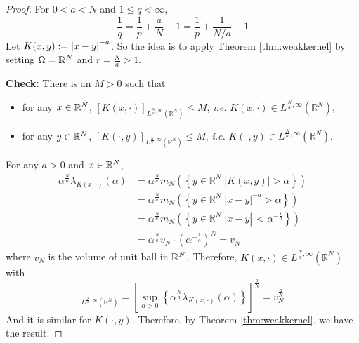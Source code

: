 \begin{proof}
	For $0 < a < N$ and $1 \leq q < \infty$,
	\begin{equation*}
		\frac{1}{q}=\frac{1}{p}+\frac{a}{N}-1=\frac{1}{p}+\frac{1}{N / a}-1
	\end{equation*}
	Let $K(x,y) \vcentcolon= \left\lvert x - y\right\lvert^{-a}$. So the idea is to apply Theorem \ref{thm:weakkernel} by setting $\Omega = \mathbb{R}^N$ and $r = \frac{N}{a} > 1$.

	\noindent \textbf{Check:} There is an $M > 0$ such that
	\begin{itemize}
		\item for any $x \in \mathbb{R}^N$, $[K(x, \cdot)]_{L^{\frac{N}{a}, \infty}\left(\mathbb{R}^N\right)} \leq M$, \emph{i.e.} $K(x, \cdot) \in L^{\frac{N}{a}, \infty}\left(\mathbb{R}^N\right)$,
		\item for any $y \in \mathbb{R}^N$, $[K(\cdot,y)]_{L^{\frac{N}{a}, \infty}\left(\mathbb{R}^N\right)} \leq M$, \emph{i.e.} $K(\cdot,y) \in L^{\frac{N}{a}, \infty}\left(\mathbb{R}^N\right)$.
	\end{itemize}
	For any $a > 0$ and $x \in \mathbb{R}^N$, 
	\begin{equation*}
		\begin{aligned}
			\alpha^{\frac{N}{a}} \lambda_{K(x, \cdot)}(\alpha) & =\alpha^{\frac{N}{a}} m_N\left(\left\{y \in \mathbb{R}^N| | K(x, y) \mid>\alpha\right\}\right) \\
			& =\alpha^{\frac{N}{a}} m_N\left(\left\{y \in \mathbb{R}^N| | x-\left.y\right|^{-a}>\alpha\right\}\right) \\
			& =\alpha^{\frac{N}{a}} m_N\left(\left\{y \in \mathbb{R}^N| | x-y \left\lvert\,<\alpha^{-\frac{1}{a}}\right.\right\}\right) \\
			& =\alpha^{\frac{N}{a}} v_N \cdot\left(\alpha^{-\frac{1}{a}}\right)^N=v_N
		\end{aligned}
	\end{equation*}
	where $v_N$ is the volume of unit ball in $\mathbb{R}^N$. Therefore, $K(x, \cdot) \in L^{\frac{N}{a}, \infty}\left(\mathbb{R}^N\right)$ with
	\begin{equation*}
		[K(x, \cdot)]_{L^{\frac{N}{a}, \infty}\left(\mathbb{R}^N\right)}=\left[\sup _{\alpha>0}\left\{\alpha^{\frac{N}{a}} \lambda_{K(x, \cdot)}(\alpha)\right\}\right]^{\frac{a}{N}}=v_N^{\frac{a}{N}}
	\end{equation*}
	And it is similar for $K(\cdot,y)$. 
	\noindent Therefore, by Theorem \ref{thm:weakkernel}, we have the result.
\end{proof}

